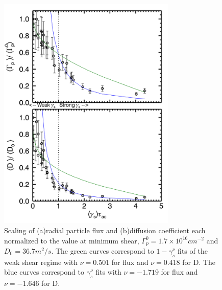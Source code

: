 \documentclass[aip,pop,amsmath,amssymb,reprint,superscriptaddress]{revtex4-1} %
\begin{document}
\begin{figure}[!htbp]
\centerline{
\includegraphics[width=8.5cm]{fluxandD}}
\caption{\label{fig:fluxandD} Scaling of (a)radial particle flux and (b)diffusion coefficient each normalized to the value at minimum shear, $\Gamma_{p}^{0} = 1.7\times10^{16} cm^{-2}$ and $D_{0} = 36.7 m^{2}/s$. The green curves correspond to $1-\gamma_{s}^{\nu}$ fits of the weak shear regime with $\nu = 0.501$ for flux and $\nu = 0.418$ for D. The blue curves correspond to $\gamma_{s}^{\nu}$ fits with $\nu = -1.719$ for flux and $\nu = -1.646$ for D.}
\end{figure}
\end{document}
